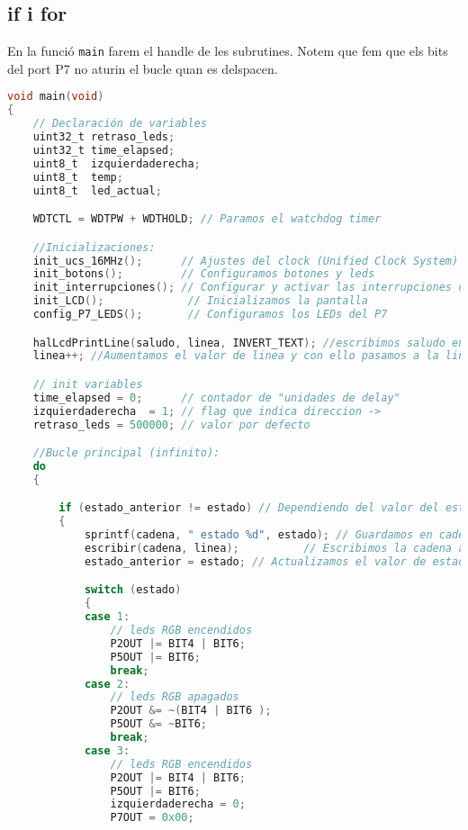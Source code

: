 \documentclass[12pt,a4paper]{article}
\begin{document}
\subsection{if i for}

En la funció \texttt{main} farem el handle de les subrutines. Notem que fem que els bits del port P7 no aturin el bucle quan es delspacen.

\begin{lstlisting}[language=C]
void main(void)
{
    // Declaración de variables
    uint32_t retraso_leds;
    uint32_t time_elapsed;
    uint8_t  izquierdaderecha;
    uint8_t  temp;
    uint8_t  led_actual;

    WDTCTL = WDTPW + WDTHOLD; // Paramos el watchdog timer

    //Inicializaciones:
    init_ucs_16MHz();      // Ajustes del clock (Unified Clock System)
    init_botons();         // Configuramos botones y leds
    init_interrupciones(); // Configurar y activar las interrupciones de los botones
    init_LCD();             // Inicializamos la pantalla
    config_P7_LEDS();       // Configuramos los LEDs del P7

    halLcdPrintLine(saludo, linea, INVERT_TEXT); //escribimos saludo en la primera linea
    linea++; //Aumentamos el valor de linea y con ello pasamos a la linea siguiente

    // init variables
    time_elapsed = 0;      // contador de "unidades de delay"
    izquierdaderecha  = 1; // flag que indica direccion ->
    retraso_leds = 500000; // valor por defecto

    //Bucle principal (infinito):
    do
    {

        if (estado_anterior != estado) // Dependiendo del valor del estado se encenderá un LED u otro.
        {
            sprintf(cadena, " estado %d", estado); // Guardamos en cadena la siguiente frase: estado "valor del estado"
            escribir(cadena, linea);          // Escribimos la cadena al LCD
            estado_anterior = estado; // Actualizamos el valor de estado_anterior, para que no est� siempre escribiendo.

            switch (estado)
            {
            case 1:
                // leds RGB encendidos
                P2OUT |= BIT4 | BIT6;
                P5OUT |= BIT6;
                break;
            case 2:
                // leds RGB apagados
                P2OUT &= ~(BIT4 | BIT6 );
                P5OUT &= ~BIT6;
                break;
            case 3:
                // leds RGB encendidos
                P2OUT |= BIT4 | BIT6;
                P5OUT |= BIT6;
                izquierdaderecha = 0;
                P7OUT = 0x00;


\end{lstlisting}
\end{document}
